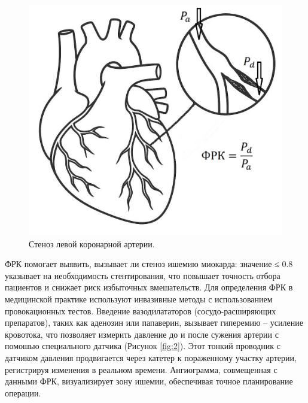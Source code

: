 \begin{figure}
	\centering
	\includegraphics[]{images/chap1/FFR_dem.jpg}
	\caption{Стеноз левой коронарной артерии.}
	\label{fig:1}
\end{figure}

ФРК помогает выявить, вызывает ли стеноз ишемию миокарда: значение ≤ 0.8 указывает на необходимость стентирования, что повышает точность отбора пациентов и снижает риск избыточных вмешательств. Для определения ФРК в медицинской практике используют инвазивные методы с использованием провокационных тестов. Введение вазодилататоров (сосудо-расширяющих препаратов), таких как аденозин или папаверин, вызывает гиперемию -- усиление кровотока, что позволяет измерить давление до и после сужения артерии с помошью специального датчика (Рисунок {\ref*{fig:2}}). Этот тонкий проводник с датчиком давления продвигается через катетер к пораженному участку артерии, регистрируя изменения в реальном времени. Ангиограмма, совмещенная с данными ФРК, визуализирует зону ишемии, обеспечивая точное планирование операции.

